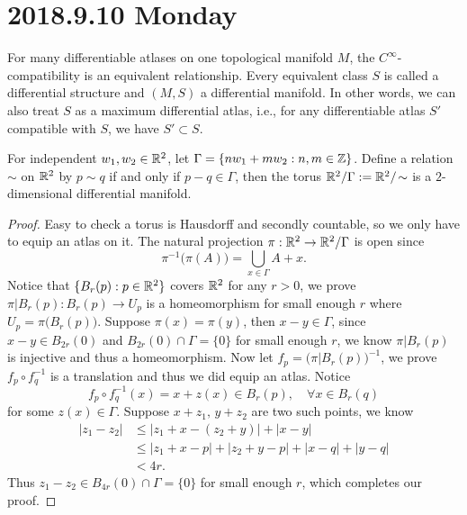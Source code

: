 \section{2018.9.10 Monday}
\begin{defi}
	For many differentiable atlases on one topological manifold $M$, the $C^\infty$-compatibility
	is an equivalent relationship. Every equivalent class $S$ is called a differential structure
	and $(M,S)$ a differential manifold. In other words, we can also treat $S$ as a maximum differential
	atlas, i.e., for any differentiable atlas $S'$ compatible with $S$, we have $S'\subset S$.
\end{defi}
\begin{ex}[Torus]
	For independent $w_1,w_2\in\mathbb{R}^2$, let $\Gamma=\{nw_1+mw_2: n,m\in\mathbb{Z}\}$. Define a relation $\sim$ on
	$\mathbb{R}^2$ by $p\sim q$ if and only if $p-q\in \Gamma$, then the torus $\mathbb{R}^2/\Gamma:=\mathbb{R}^2/\!\sim$ is a $2$-dimensional differential manifold.
\end{ex}
\begin{proof}
	Easy to check a torus is Hausdorff and secondly countable, so we only have to equip an atlas on it. The natural projection $\pi:\mathbb{R}^2\to\mathbb{R}^2/\Gamma$ is open since
	\[\pi^{-1}\big(\pi(A)\big)=\bigcup_{x\in \Gamma} A+x.\]
	Notice that $\{B_r(p):p\in\mathbb{R}^2\}$ covers $\mathbb{R}^2$ for any $r>0$, we prove $\pi|B_r(p): B_r(p)\to U_p$
	is a homeomorphism for small enough $r$ where $U_p=\pi\big(B_r(p)\big)$. Suppose $\pi(x)=\pi(y)$, then $x-y\in \Gamma$, since $x-y\in B_{2r}(0)$ and $B_{2r}(0)\cap \Gamma=\{0\}$ for small enough $r$, we know $\pi|B_r(p)$ is injective and thus a homeomorphism. Now let $f_p=\big(\pi|B_r(p)\big)^{-1}$, we prove $f_p\circ f_q^{-1}$ is a translation and thus we did equip an atlas. Notice
	\[f_p\circ f_q^{-1}(x)=x+z(x)\in B_r(p),\quad \forall x\in B_r(q)\]
	for some $z(x)\in \Gamma$. Suppose $x+z_1,\,y+z_2$ are two such points, we know
	\begin{align*}
		|z_1-z_2|&\leq \big|z_1+x-(z_2+y)\big|+|x-y|\\
				 &\leq |z_1+x-p|+|z_2+y-p|+|x-q|+|y-q|\\
				 &<4r.
	\end{align*}
	Thus $z_1-z_2\in B_{4r}(0)\cap \Gamma=\{0\}$ for small enough $r$, which completes our proof.
\end{proof}